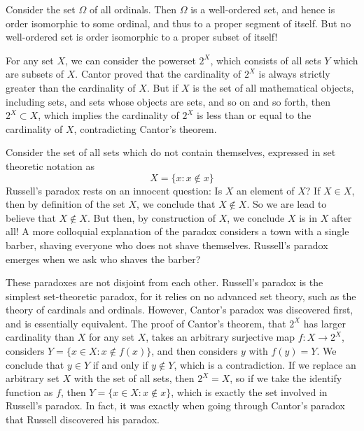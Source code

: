 \begin{example}
    Consider the set $\Omega$ of all ordinals. Then $\Omega$ is a well-ordered set, and hence is order isomorphic to some ordinal, and thus to a proper segment of itself. But no well-ordered set is order isomorphic to a proper subset of itself!
\end{example}

\begin{example}
    For any set $X$, we can consider the powerset $2^X$, which consists of all sets $Y$ which are subsets of $X$. Cantor proved that the cardinality of $2^X$ is always strictly greater than the cardinality of $X$. But if $X$ is the set of all mathematical objects, including sets, and sets whose objects are sets, and so on and so forth, then $2^X \subset X$, which implies the cardinality of $2^X$ is less than or equal to the cardinality of $X$, contradicting Cantor's theorem.
\end{example}

\begin{example}
    Consider the set of all sets which do not contain themselves, expressed in set theoretic notation as
    \[ X = \{ x: x \not \in x \} \]
    Russell's paradox rests on an innocent question: Is $X$ an element of $X$? If $X \in X$, then by definition of the set $X$, we conclude that $X \not \in X$. So we are lead to believe that $X \not \in X$. But then, by construction of $X$, we conclude $X$ is in $X$ after all! A more colloquial explanation of the paradox considers a town with a single barber, shaving everyone who does not shave themselves. Russell's paradox emerges when we ask who shaves the barber?
\end{example}

\begin{remark}
    These paradoxes are not disjoint from each other. Russell's paradox is the simplest set-theoretic paradox, for it relies on no advanced set theory, such as the theory of cardinals and ordinals. However, Cantor's paradox was discovered first, and is essentially equivalent. The proof of Cantor's theorem, that $2^X$ has larger cardinality than $X$ for any set $X$, takes an arbitrary surjective map $f: X \to 2^X$, considers $Y = \{ x \in X: x \not \in f(x) \}$, and then considers $y$ with $f(y) = Y$. We conclude that $y \in Y$ if and only if $y \not \in Y$, which is a contradiction. If we replace an arbitrary set $X$ with the set of all sets, then $2^X = X$, so if we take the identify function as $f$, then $Y = \{ x \in X: x \not \in x \}$, which is exactly the set involved in Russell's paradox. In fact, it was exactly when going through Cantor's paradox that Russell discovered his paradox.
\end{remark}

